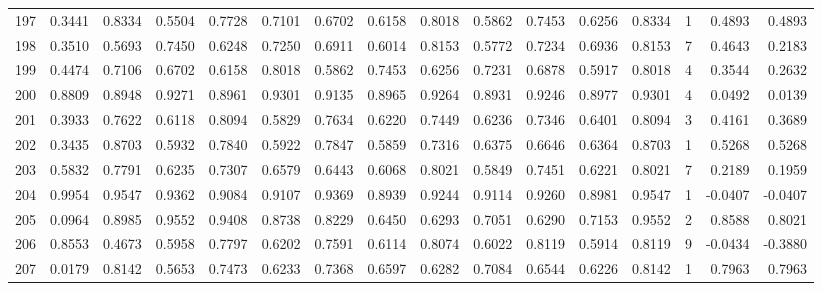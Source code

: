 \begin{tabular}{lrrrrrrrrrrrrrrr}
197 &      0.3441 &  0.8334 &  0.5504 &  0.7728 &  0.7101 &  0.6702 &  0.6158 &  0.8018 &  0.5862 &  0.7453 &   0.6256 &     0.8334 &      1 &                    0.4893 &                     0.4893 \\
198 &      0.3510 &  0.5693 &  0.7450 &  0.6248 &  0.7250 &  0.6911 &  0.6014 &  0.8153 &  0.5772 &  0.7234 &   0.6936 &     0.8153 &      7 &                    0.4643 &                     0.2183 \\
199 &      0.4474 &  0.7106 &  0.6702 &  0.6158 &  0.8018 &  0.5862 &  0.7453 &  0.6256 &  0.7231 &  0.6878 &   0.5917 &     0.8018 &      4 &                    0.3544 &                     0.2632 \\
200 &      0.8809 &  0.8948 &  0.9271 &  0.8961 &  0.9301 &  0.9135 &  0.8965 &  0.9264 &  0.8931 &  0.9246 &   0.8977 &     0.9301 &      4 &                    0.0492 &                     0.0139 \\
201 &      0.3933 &  0.7622 &  0.6118 &  0.8094 &  0.5829 &  0.7634 &  0.6220 &  0.7449 &  0.6236 &  0.7346 &   0.6401 &     0.8094 &      3 &                    0.4161 &                     0.3689 \\
202 &      0.3435 &  0.8703 &  0.5932 &  0.7840 &  0.5922 &  0.7847 &  0.5859 &  0.7316 &  0.6375 &  0.6646 &   0.6364 &     0.8703 &      1 &                    0.5268 &                     0.5268 \\
203 &      0.5832 &  0.7791 &  0.6235 &  0.7307 &  0.6579 &  0.6443 &  0.6068 &  0.8021 &  0.5849 &  0.7451 &   0.6221 &     0.8021 &      7 &                    0.2189 &                     0.1959 \\
204 &      0.9954 &  0.9547 &  0.9362 &  0.9084 &  0.9107 &  0.9369 &  0.8939 &  0.9244 &  0.9114 &  0.9260 &   0.8981 &     0.9547 &      1 &                   -0.0407 &                    -0.0407 \\
205 &      0.0964 &  0.8985 &  0.9552 &  0.9408 &  0.8738 &  0.8229 &  0.6450 &  0.6293 &  0.7051 &  0.6290 &   0.7153 &     0.9552 &      2 &                    0.8588 &                     0.8021 \\
206 &      0.8553 &  0.4673 &  0.5958 &  0.7797 &  0.6202 &  0.7591 &  0.6114 &  0.8074 &  0.6022 &  0.8119 &   0.5914 &     0.8119 &      9 &                   -0.0434 &                    -0.3880 \\
207 &      0.0179 &  0.8142 &  0.5653 &  0.7473 &  0.6233 &  0.7368 &  0.6597 &  0.6282 &  0.7084 &  0.6544 &   0.6226 &     0.8142 &      1 &                    0.7963 &                     0.7963 \\

\end{tabular}

